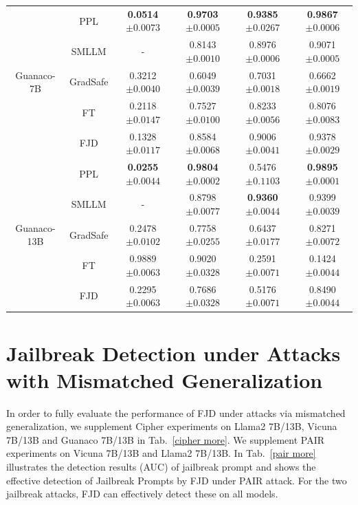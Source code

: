 \documentclass{article}
\begin{document}
\begin{table}[t]
\begin{tabular}{cccccc}
    \midrule
    \multirow{5}{*}{Guanaco-7B} 
    & PPL  & \textbf{0.0514}\tiny{$\pm 0.0073$} & \textbf{0.9703}\tiny{$\pm 0.0005$} & \textbf{0.9385}\tiny{$\pm 0.0267$} & \textbf{0.9867}\tiny{$\pm 0.0006$} \\
    & SMLLM & - & 0.8143\tiny{$\pm 0.0010$} & 0.8976\tiny{$\pm 0.0006$} & 0.9071\tiny{$\pm 0.0005$} \\
    & GradSafe & 0.3212\tiny{$\pm 0.0040$} & 0.6049\tiny{$\pm 0.0039$} & 0.7031\tiny{$\pm 0.0018$} & 0.6662\tiny{$\pm 0.0019$} \\
    & FT & 0.2118\tiny{$\pm 0.0147$} & 0.7527\tiny{$\pm 0.0100$} & 0.8233\tiny{$\pm 0.0056$} & 0.8076\tiny{$\pm 0.0083$} \\
    & FJD & 0.1328\tiny{$\pm 0.0117$} & 0.8584\tiny{$\pm 0.0068$} & 0.9006\tiny{$\pm 0.0041$} & 0.9378\tiny{$\pm 0.0029$} \\
    \midrule
    \multirow{5}{*}{Guanaco-13B} 
    & PPL & \textbf{0.0255}\tiny{$\pm 0.0044$} & \textbf{0.9804}\tiny{$\pm 0.0002$} & 0.5476\tiny{$\pm 0.1103$} & \textbf{0.9895}\tiny{$\pm 0.0001$} \\
    & SMLLM & - & 0.8798\tiny{$\pm 0.0077$} & \textbf{0.9360}\tiny{$\pm 0.0044$} & 0.9399\tiny{$\pm 0.0039$}\\
    & GradSafe & 0.2478\tiny{$\pm 0.0102$} & 0.7758\tiny{$\pm 0.0255$} & 0.6437\tiny{$\pm 0.0177$} & 0.8271\tiny{$\pm 0.0072$}  \\
    & FT & 0.9889\tiny{$\pm 0.0063$} & 0.9020\tiny{$\pm 0.0328$} & 0.2591\tiny{$\pm 0.0071$} & 0.1424\tiny{$\pm 0.0044$} \\
    & FJD & 0.2295\tiny{$\pm 0.0063$} & 0.7686\tiny{$\pm 0.0328$} & 0.5176\tiny{$\pm 0.0071$} & 0.8490\tiny{$\pm 0.0044$} \\
    
    \bottomrule
  \end{tabular} 

\end{table}



\section{Jailbreak Detection under Attacks with Mismatched Generalization}\label{app:mg}

In order to fully evaluate the performance of FJD under attacks via mismatched generalization, we supplement Cipher experiments on Llama2 7B/13B, Vicuna 7B/13B and Guanaco 7B/13B in Tab.~\ref{cipher more}. We supplement PAIR experiments on Vicuna 7B/13B and Llama2 7B/13B. In Tab.~\ref{pair more} illustrates the detection results (AUC) of jailbreak prompt and shows the effective detection of Jailbreak Prompts by FJD under PAIR attack. For the two jailbreak attacks, FJD can effectively detect these on all models.
\end{document}
